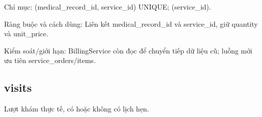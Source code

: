 Chỉ mục:\allowbreak{} (medical\_\allowbreak{}record\_\allowbreak{}id, service\_\allowbreak{}id) UNIQUE; (service\_\allowbreak{}id).\allowbreak{}

Ràng buộc và cách dùng:\allowbreak{} Liên kết medical\_\allowbreak{}record\_\allowbreak{}id và service\_\allowbreak{}id, giữ quantity và unit\_\allowbreak{}price.\allowbreak{}

Kiểm soát/\allowbreak{}giới hạn:\allowbreak{} Billing\allowbreak{}Service còn đọc để chuyển tiếp dữ liệu cũ; luồng mới ưu tiên service\_\allowbreak{}orders/\allowbreak{}items.\allowbreak{}

\clearpage

\subsection{visits}
Lượt khám thực tế, có hoặc không có lịch hẹn.\allowbreak{}


